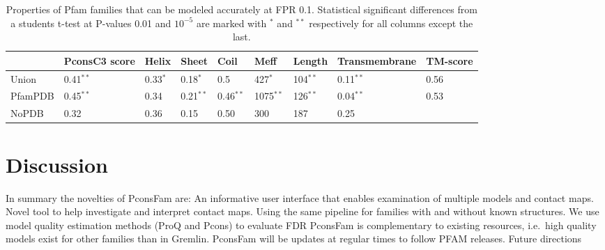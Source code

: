 \documentclass[a4,center,fleqn]{NAR}
\begin{document}
\begin{table}[tb!]
\centering
\caption{Properties of Pfam families that can be modeled accurately at FPR
0.1. Statistical significant differences
from a students t-test at P-values 0.01 and $10^{-5}$ are marked with $^*$ and
$^{**}$ respectively for all columns except the last.}

\label{tab:nopdb2}
\begin{tabular}{lllllllll}
  \hline
  & PconsC3 score & Helix & Sheet & Coil & Meff & Length & Transmembrane & TM-score\\ 
  \hline
  Union & 0.41$^{**}$ & 0.33$^{*}$ & 0.18$^{*}$ & 0.5 & 427$^*$ & 104$^{**}$ & 0.11$^{**}$ & 0.56\\ 
  PfamPDB & 0.45$^{**}$ & 0.34 & 0.21$^{**}$ & 0.46$^{**}$ & 1075$^{**}$ & 126$^{**}$ & 0.04$^{**}$ & 0.53 \\ \hline
  NoPDB & 0.32 & 0.36 & 0.15 & 0.50 & 300 & 187 & 0.25 & \\
   \hline
\end{tabular}

\end{table}



\section{Discussion}



                
In summary the novelties of PconsFam are:
An informative user interface that enables examination of multiple models and contact maps.
Novel tool to help investigate and interpret contact maps.
Using the same pipeline for families with and without known structures.
We use model quality estimation methods (ProQ and Pcons) to evaluate FDR 
PconsFam is complementary to existing resources, i.e.\ high quality models exist for other families than in Gremlin.
PconsFam will be updates at regular times to follow PFAM releases.
Future directions
\end{document}
